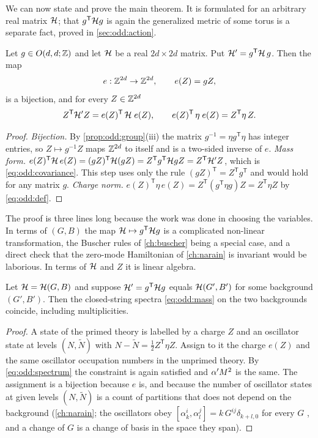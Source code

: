 We can now state and prove the main theorem. It is formulated for an arbitrary real
matrix $\mathcal{H}$; that $g^{\mathsf T}\mathcal{H} g$ is again the generalized metric of some
torus is a separate fact, proved in \cref{sec:odd:action}.

\begin{theorem}\label{thm:odd:spectrum}
Let $g\in O(d,d;\mathbb{Z})$ and let $\mathcal{H}$ be a real $2d\times2d$ matrix. Put
$\mathcal{H}'=g^{\mathsf T}\mathcal{H}\,g$. Then the map
\[
 e:\mathbb{Z}^{2d}\to\mathbb{Z}^{2d},\qquad e(Z)=gZ,
\]
is a bijection, and for every $Z\in\mathbb{Z}^{2d}$
\begin{equation}\label{eq:odd:spectrum}
 Z^{\mathsf T}\mathcal{H}'Z=e(Z)^{\mathsf T}\,\mathcal{H}\;e(Z),\qquad
 e(Z)^{\mathsf T}\,\eta\;e(Z)=Z^{\mathsf T}\eta\,Z .
\end{equation}
\end{theorem}
\begin{proof}
\emph{Bijection.} By \cref{prop:odd:group}(iii) the matrix $g^{-1}=\eta g^{\mathsf T}\eta$ has
integer entries, so $Z\mapsto g^{-1}Z$ maps $\mathbb{Z}^{2d}$ to itself and is a two-sided inverse
of $e$.
\emph{Mass form.} $e(Z)^{\mathsf T}\mathcal{H}\,e(Z)=(gZ)^{\mathsf T}\mathcal{H}(gZ)
=Z^{\mathsf T}g^{\mathsf T}\mathcal{H} gZ=Z^{\mathsf T}\mathcal{H}'Z$, which is \eqref{eq:odd:covariance}.
This step uses only the rule $(gZ)^{\mathsf T}=Z^{\mathsf T}g^{\mathsf T}$ and would hold
for any matrix $g$.
\emph{Charge norm.} $e(Z)^{\mathsf T}\eta\,e(Z)=Z^{\mathsf T}(g^{\mathsf T}\eta g)Z
=Z^{\mathsf T}\eta Z$ by \eqref{eq:odd:def}.
\end{proof}

The proof is three lines long because the work was done in choosing the variables. In
terms of $(G,B)$ the map $\mathcal{H}\mapsto g^{\mathsf T}\mathcal{H} g$ is a complicated non-linear
transformation, the Buscher rules of \cref{ch:buscher} being a special case, and a direct
check that the zero-mode Hamiltonian of \cref{ch:narain} is invariant would be laborious. In
terms of $\mathcal{H}$ and $Z$ it is linear algebra.

\begin{corollary}\label{cor:odd:full}
Let $\mathcal{H}=\mathcal{H}(G,B)$ and suppose $\mathcal{H}'=g^{\mathsf T}\mathcal{H} g$ equals $\mathcal{H}(G',B')$ for some
background $(G',B')$. Then the closed-string spectra \eqref{eq:odd:mass} on the two
backgrounds coincide, including multiplicities.
\end{corollary}
\begin{proof}
A state of the primed theory is labelled by a charge $Z$ and an oscillator state at levels
$(N,\tilde N)$ with $N-\tilde N=\frac12Z^{\mathsf T}\eta Z$. Assign to it the charge $e(Z)$
and the same oscillator occupation numbers in the unprimed theory. By
\eqref{eq:odd:spectrum} the constraint is again satisfied and $\alpha' M^2$ is the same. The
assignment is a bijection because $e$ is, and because the number of oscillator states at
given levels $(N,\tilde N)$ is a count of partitions that does not depend on the background
(\cref{ch:narain}; the oscillators obey
$[\alpha^i_k,\alpha^j_l]=k\,G^{ij}\delta_{k+l,0}$ for every $G$ , and a change of $G$ is a change of basis in the space
they span).
\end{proof}

